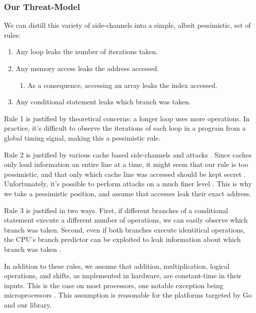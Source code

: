 \documentclass[11pt, a4paper]{article} %
\begin{document}
{\subsubsection{Our Threat-Model}
\label{threat_model}

We can distill this variety of side-channels into a simple,
albeit pessimistic, set of rules:

\begin{enumerate}
  \item Any loop leaks the number of iterations taken.
  \item Any memory access leaks the address accessed.
  \begin{enumerate}
    \item As a consequence, accessing an array leaks the index accessed.
  \end{enumerate}
  \item Any conditional statement leaks which branch was taken.
\end{enumerate}

Rule 1 is justified by theoretical concerns: a longer loop
uses more operations. In practice, it's difficult to observe
the iterations of each loop in a program from a global timing signal,
making this a pessimistic rule.

Rule 2 is justified by various cache based side-channels and attacks
\cite{
  bernstein_cache-timing_2005,
  yarom_cachebleed_2017,
  cabrera_aldaya_cache-timing_2019}.
Since caches only load information an entire line at a time, it might
seem that our rule is too pessimistic, and that only which cache line
was accessed should be kept secret \cite{brickell_technologies_2011}.
Unfortunately, it's possible to perform
attacks on a much finer level
\cite{
  bernstein_word_2013,
  osvik_cache_2006,
  yarom_cachebleed_2017}.
This is why we take a pessimistic position, and assume
that accesses leak their exact address.


Rule 3 is justified in two ways. First, if different branches of a conditional
statement execute a different number of operations,
we can easily observe which branch was taken. Second, even if both
branches execute identitical operations, the CPU's branch predictor
can be exploited to leak information about which branch was taken
\cite{
  aciicmez_predicting_2006,
  aciicmez_power_2007,
  evtyushkin_jump_2016}.

In addition to these rules, we assume that addition, multiplication,
logical operations, and shifts, as implemented in hardware,
are constant-time in their inputs.
This is the case on most processors, one notable exception being
microprocessors
\cite{pornin_bearssl_nodate}. This assumption is reasonable
for the platforms targeted by Go and our library.

}
\end{document}
